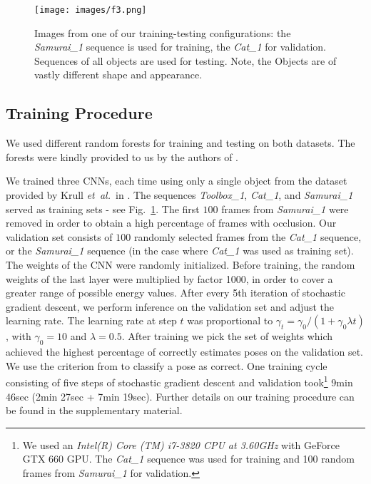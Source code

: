 \documentclass[10pt,letterpaper]{article}
\newcommand{\etal}{\mbox{\emph{et al.\ }}}
\begin{document}
\begin{figure}[!ht]
\begin{center}
\texttt{[image: images/f3.png]}
\end{center}
   \caption{Images from one of our training-testing configurations: the \emph{Samurai\_1} sequence is used for training,  the \emph{Cat\_1} for validation. Sequences of all objects are used for testing. Note, the Objects are of vastly different shape and appearance.}
\label{fig:trainValidateTest}
\end{figure}



\subsection{Training Procedure}
We used different random forests for training and testing on both datasets. The forests were kindly provided to us by the authors of \cite{brachmann2014}. 

We trained three CNNs, each time using only a single object from the dataset provided by Krull \etal in \cite{krull2014}. The sequences \emph{Toolbox\_1}, \emph{Cat\_1}, and \emph{Samurai\_1} served as training sets - see Fig.~\ref{fig:trainValidateTest}. The first $100$ frames from \emph{Samurai\_1} were removed in order to obtain a high percentage of frames with occlusion. Our validation set consists of $100$ randomly selected frames from the \emph{Cat\_1} sequence, or the \emph{Samurai\_1} sequence (in the case where \emph{Cat\_1} was used as training set).
The weights of the CNN were randomly initialized. Before training, the random weights of the last layer were multiplied by factor 1000, in order to cover a greater range of possible energy values.
After every 5th iteration of stochastic gradient descent, we perform inference on the validation set and  adjust the learning rate. The learning rate at step $t$ was proportional to $\gamma_t= \gamma_0 / (1+\gamma_0 \lambda t)$ \cite{bottou-tricks-2012}, with $\gamma_0=10$ and $\lambda=0.5$.
After training we pick the set of weights which achieved the highest percentage of correctly estimates poses on the validation set. We use the criterion from \cite{hinterstoisser2012accv} to classify a pose as correct. One training cycle consisting of five steps of stochastic gradient descent and validation took\footnote{We used an \emph{Intel(R) Core (TM) i7-3820 CPU at 3.60GHz} with GeForce GTX 660 GPU. The \emph{Cat\_1} sequence was used for training and 100 random frames from \emph{Samurai\_1} for validation.} 9min 46sec (2min 27sec + 7min 19sec).
Further details on our training procedure can be found in the supplementary material. 
\end{document}
